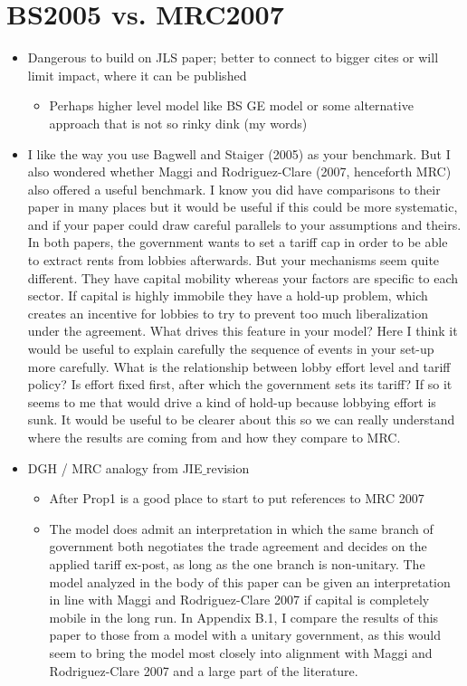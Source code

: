 \documentclass[12pt]{article}
\begin{document}
\section{BS2005 vs. MRC2007}
	\begin{itemize}
		\item Dangerous to build on JLS paper; better to connect to bigger cites or will limit impact, where it can be published
			\begin{itemize}
				\item Perhaps higher level model like BS GE model or some alternative approach that is not so rinky dink (my words)
			\end{itemize}
		\item I like the way you use Bagwell and Staiger (2005) as your benchmark.  But I also wondered whether Maggi and Rodriguez-Clare (2007, henceforth MRC) also offered a useful benchmark.  I know you did have comparisons to their paper in many places but it would be useful if this could be more systematic, and if your paper could draw careful parallels to your assumptions and theirs.  In both papers, the government wants to set a tariff cap in order to be able to extract rents from lobbies afterwards.  But your mechanisms seem quite different.  They have capital mobility whereas your factors are specific to each sector.  If capital is highly immobile they have a hold-up problem, which creates an incentive for lobbies to try to prevent too much liberalization under the agreement.  What drives this feature in your model?  Here I think it would be useful to explain carefully the sequence of events in your set-up more carefully.  What is the relationship between lobby effort level and tariff policy?  Is effort fixed first, after which the government sets its tariff?  If so it seems to me that would drive a kind of hold-up because lobbying effort is sunk.  It would be useful to be clearer about this so we can really understand where the results are coming from and how they compare to MRC. 
		\item DGH / MRC analogy from JIE$\_$revision
			\begin{itemize}
				\item After Prop1 is a good place to start to put references to MRC 2007
				\item The model does admit an interpretation in which the same branch of government both negotiates the trade agreement and decides on the applied tariff ex-post, as long as the one branch is non-unitary. The model analyzed in the body of this paper can be given an interpretation in line with Maggi and Rodriguez-Clare 2007 if capital is completely mobile in the long run. In Appendix B.1, I compare the results of this paper to those from a model with a unitary government, as this would seem to bring the model most closely into alignment with Maggi and Rodriguez-Clare 2007 and a large part of the literature.

\end{itemize}
\end{itemize}
\end{document}
